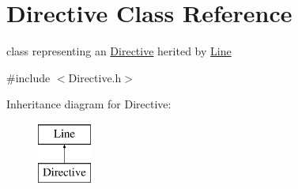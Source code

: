 \hypertarget{classDirective}{\section{\-Directive \-Class \-Reference}
\label{classDirective}
}


class representing an \hyperlink{classDirective}{\-Directive} herited by \hyperlink{classLine}{\-Line}  




{\ttfamily \#include $<$\-Directive.\-h$>$}

\-Inheritance diagram for \-Directive\-:\begin{figure}[H]
\begin{center}
\leavevmode
\includegraphics[height=2.000000cm]{classDirective}
\end{center}
\end{figure}
